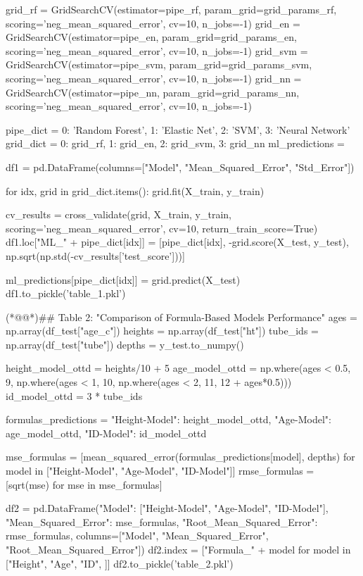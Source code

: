 \documentclass[11pt]{article}
\begin{document}
\begin{python}
grid_rf = GridSearchCV(estimator=pipe_rf, param_grid=grid_params_rf, scoring='neg_mean_squared_error', cv=10, n_jobs=-1) 
grid_en = GridSearchCV(estimator=pipe_en, param_grid=grid_params_en, scoring='neg_mean_squared_error', cv=10, n_jobs=-1)
grid_svm = GridSearchCV(estimator=pipe_svm, param_grid=grid_params_svm, scoring='neg_mean_squared_error', cv=10, n_jobs=-1)
grid_nn = GridSearchCV(estimator=pipe_nn, param_grid=grid_params_nn, scoring='neg_mean_squared_error', cv=10, n_jobs=-1)

pipe_dict = {0: 'Random Forest', 1: 'Elastic Net', 2: 'SVM', 3: 'Neural Network'}
grid_dict = {0: grid_rf, 1: grid_en, 2: grid_svm, 3: grid_nn}
ml_predictions = {}

df1 = pd.DataFrame(columns=["Model", "Mean_Squared_Error", "Std_Error"])

for idx, grid in grid_dict.items():
    grid.fit(X_train, y_train)
    
    cv_results = cross_validate(grid, X_train, y_train, scoring='neg_mean_squared_error', cv=10, return_train_score=True)
    df1.loc["ML_" + pipe_dict[idx]] = [pipe_dict[idx], -grid.score(X_test, y_test), np.sqrt(np.std(-cv_results['test_score']))]
    
    ml_predictions[pipe_dict[idx]] = grid.predict(X_test)
df1.to_pickle('table_1.pkl')

(*@@*)## Table 2: "Comparison of Formula-Based Models Performance"
ages = np.array(df_test["age_c"])
heights = np.array(df_test["ht"])
tube_ids = np.array(df_test["tube"])
depths = y_test.to_numpy()

height_model_ottd = heights/10 + 5
age_model_ottd = np.where(ages < 0.5, 9, np.where(ages < 1, 10, np.where(ages < 2, 11, 12 + ages*0.5)))
id_model_ottd = 3 * tube_ids

formulas_predictions = {
    "Height-Model": height_model_ottd,
    "Age-Model": age_model_ottd,
    "ID-Model": id_model_ottd
}

mse_formulas = [mean_squared_error(formulas_predictions[model], depths) for model in ["Height-Model", "Age-Model", "ID-Model"]]
rmse_formulas = [sqrt(mse) for mse in mse_formulas]

df2 = pd.DataFrame({"Model": ["Height-Model", "Age-Model", "ID-Model"], "Mean_Squared_Error": mse_formulas, "Root_Mean_Squared_Error": rmse_formulas}, columns=["Model", "Mean_Squared_Error", "Root_Mean_Squared_Error"])
df2.index = ["Formula_" + model for model in ["Height", "Age", "ID", ]]
df2.to_pickle('table_2.pkl')


\end{python}
\end{document}
